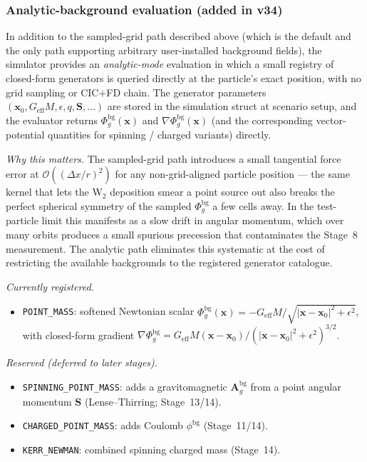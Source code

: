 \documentclass[11pt,a4paper]{article}
\newcommand{\vv}[1]{\mathbf{#1}}
\newcommand{\Phig}{\Phi_g}
\newcommand{\Ag}{\vv{A}_g}
\newcommand{\order}[1]{\mathcal{O}(#1)}
\begin{document}
\subsubsection*{Analytic-background evaluation (added in v34)}
\label{sec:bg_mode}

In addition to the sampled-grid path described above (which is the default
and the only path supporting arbitrary user-installed background fields), the
simulator provides an \emph{analytic-mode} evaluation in which a small registry
of closed-form generators is queried directly at the particle's exact
position, with no grid sampling or CIC$+$FD chain.  The generator parameters
$(\vv{x}_0, G_{\mathrm{eff}}M, \epsilon, q, \vv{S}, \ldots)$ are stored in the
simulation struct at scenario setup, and the evaluator returns
$\Phig^{\mathrm{bg}}(\vv{x})$ and $\nabla\Phig^{\mathrm{bg}}(\vv{x})$
(and the corresponding vector-potential quantities for spinning / charged
variants) directly.

\textit{Why this matters.}  The sampled-grid path introduces a small
tangential force error at $\order{(\Delta x/r)^2}$ for any non-grid-aligned
particle position --- the same kernel that lets the W$_2$ deposition smear a
point source out also breaks the perfect spherical symmetry of the sampled
$\Phig^{\mathrm{bg}}$ a few cells away.  In the test-particle limit this
manifests as a slow drift in angular momentum, which over many orbits
produces a small spurious precession that contaminates the Stage~8
measurement.  The analytic path eliminates this systematic at the cost of
restricting the available backgrounds to the registered generator catalogue.

\textit{Currently registered.}
\begin{itemize}
  \item \texttt{POINT\_MASS}: softened Newtonian scalar
    $\Phig^{\mathrm{bg}}(\vv{x}) = -G_{\mathrm{eff}}M/\sqrt{|\vv{x}-\vv{x}_0|^2+\epsilon^2}$,
    with closed-form gradient
    $\nabla\Phig^{\mathrm{bg}} = G_{\mathrm{eff}}M(\vv{x}-\vv{x}_0)/(|\vv{x}-\vv{x}_0|^2+\epsilon^2)^{3/2}$.
\end{itemize}

\textit{Reserved (deferred to later stages).}
\begin{itemize}
  \item \texttt{SPINNING\_POINT\_MASS}: adds a gravitomagnetic $\Ag^{\mathrm{bg}}$
    from a point angular momentum $\vv{S}$ (Lense--Thirring; Stage~13/14).
  \item \texttt{CHARGED\_POINT\_MASS}: adds Coulomb $\phi^{\mathrm{bg}}$
    (Stage~11/14).
  \item \texttt{KERR\_NEWMAN}: combined spinning charged mass (Stage~14).
\end{itemize}
\end{document}
